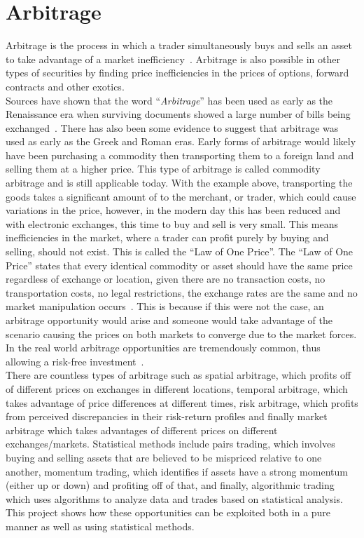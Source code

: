 \section{Arbitrage}
Arbitrage is the process in which a trader simultaneously buys and sells an asset to take advantage of a market inefficiency~\cite{businessinsightsblog_2021}. Arbitrage is also possible in other types of securities by finding price inefficiencies in the prices of options, forward contracts and other exotics.
\\[5mm]
Sources have shown that the word ``\textit{Arbitrage}'' has been used as early as the Renaissance era when surviving documents showed a large number of bills being exchanged~\cite{poitras_2021}. There has also been some evidence to suggest that arbitrage was used as early as the Greek and Roman eras. Early forms of arbitrage would likely have been purchasing a commodity then transporting them to a foreign land and selling them at a higher price. This type of arbitrage is called commodity arbitrage and is still applicable today. With the example above, transporting the goods takes a significant amount of to the merchant, or trader, which could cause variations in the price, however, in the modern day this has been reduced and with electronic exchanges, this time to buy and sell is very small. This means inefficiencies in the market, where a trader can profit purely by buying and selling, should not exist. This is called the ``Law of One Price''. The ``Law of One Price'' states that every identical commodity or asset should have the same price regardless of exchange or location, given there are no transaction costs, no transportation costs, no legal restrictions, the exchange rates are the same and no market manipulation occurs~\cite{noauthor_law_nodate}. This is because if this were not the case, an arbitrage opportunity would arise and someone would take advantage of the scenario causing the prices on both markets to converge due to the market forces. In the real world arbitrage opportunities are tremendously common, thus allowing a risk-free investment~\cite{10.2307/1828075, RICHARDSON1978341}.
\\[5mm]
There are countless types of arbitrage such as spatial arbitrage, which profits off of different prices on exchanges in different locations, temporal arbitrage, which takes advantage of price differences at different times, risk arbitrage, which profits from perceived discrepancies in their risk-return profiles and finally market arbitrage which takes advantages of different prices on different exchanges/markets. Statistical methods include pairs trading, which involves buying and selling assets that are believed to be mispriced relative to one another, momentum trading, which identifies if assets have a strong momentum (either up or down) and profiting off of that, and finally, algorithmic trading which uses algorithms to analyze data and trades based on statistical analysis. This project shows how these opportunities can be exploited both in a pure manner as well as using statistical methods.

